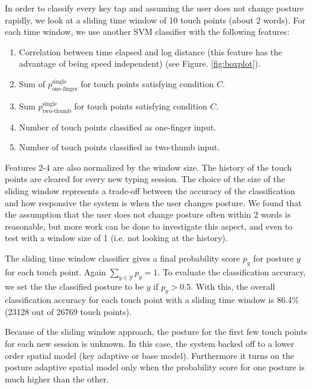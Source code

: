 \documentclass{sigchi}
\begin{document}
In order to classify every key tap and assuming the user does not change posture 
rapidly, we look at a sliding time window of 10 touch points (about 2 words). For 
each time window, we use another SVM classifier with the following features:
\begin{enumerate}
\item Correlation between time elapsed and log distance (this feature has the
advantage of being speed independent) (see Figure. \ref{fig:boxplot}).
\item Sum of $p_\text{one-finger}^{\text{single}}$ for touch points satisfying condition $C$.
\item Sum $p_\text{two-thumb}^{\text{single}}$ for touch points satisfying condition $C$.
\item Number of touch points classified as one-finger input.
\item Number of touch points classified as two-thumb input.
\end{enumerate}
Features 2-4 are also normalized by the window size. The history of the touch points are cleared for every new typing session.
The choice of the size of the sliding window represents a trade-off between the 
accuracy of the classification and how responsive the system is when the user
changes posture. We found that the assumption that the user does not change posture
often within 2 words is reasonable, but more work can be done to investigate this
aspect, and even to test with a window size of 1 (i.e. not 
looking at the history).

The sliding time window classifier gives a final probability score $p_y$ for posture
$y$ for each touch point. Again $\displaystyle\sum_{y\in \mathcal{Y}}p_y = 1$. To evaluate the classification accuracy, we set the the
classified posture to be $y$ if $p_y > 0.5$. With this, the overall classification 
accuracy for each touch point with a sliding time window
is 86.4\% (23128 out of 26769 touch points).

Because of the sliding window approach, the posture for the first few touch points  
for each new session is unknown. In this case, the system backed off to a lower order spatial 
model (key adaptive or base model). Furthermore  it turns on the posture 
adaptive spatial model only when the probability score for one posture is much 
higher than the other.

\end{document}
